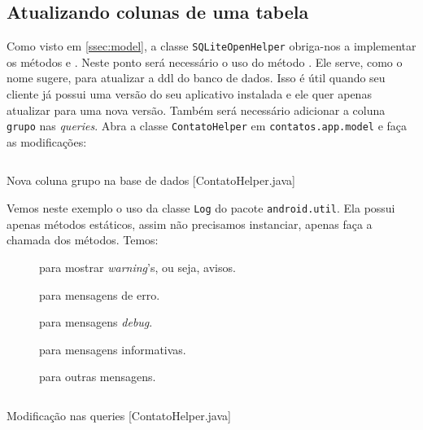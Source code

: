 
\subsection{Atualizando colunas de uma tabela}

Como visto em \ref{ssec:model}, a classe \texttt{SQLiteOpenHelper} obriga-nos a implementar os métodos
 e . Neste ponto será necessário o uso do método .
Ele serve, como o nome sugere, para atualizar a \gls{ddl} do banco de dados. Isso é útil quando seu cliente
já possui uma versão do seu aplicativo instalada e ele quer apenas atualizar para uma nova versão. Também será
necessário adicionar a coluna \texttt{grupo} nas \textit{queries}. Abra a classe \texttt{ContatoHelper} em
\texttt{contatos.app.model} e faça as modificações:

\begin{listing}[H]
  \inputminted[linenos=true,frame=bottomline,tabsize=3]{ java }{ source/ContatoHelper-6.java }
  \caption{Nova coluna grupo na base de dados [ContatoHelper.java]}
\end{listing}

Vemos neste exemplo o uso da classe \texttt{Log} do pacote \texttt{android.util}. Ela possui apenas
métodos estáticos, assim não precisamos instanciar, apenas faça a chamada dos métodos. Temos:
\begin{description}
\item[] para mostrar \textit{warning}'s, ou seja, avisos.
\item[] para mensagens de erro.
\item[] para mensagens \textit{\gls{debug}}.
\item[] para mensagens informativas.
\item[] para outras mensagens.
\end{description}

\begin{listing}[H]
  \inputminted[linenos=true,frame=bottomline,tabsize=3]{ java }{ source/ContatoHelper-7.java }
  \caption{Modificação nas queries [ContatoHelper.java]}
\end{listing}

